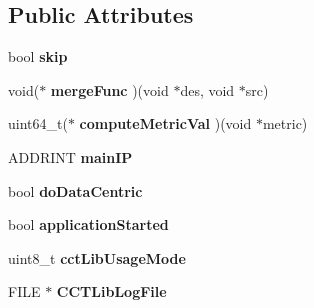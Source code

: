 \subsection*{Public Attributes}
\begin{DoxyCompactItemize}
\item 
\hypertarget{structPinCCTLib_1_1CCT__LIB__GLOBAL__STATE_a19abbe5291babc30a08934cb05a00dfe}{bool {\bfseries skip}}\label{structPinCCTLib_1_1CCT__LIB__GLOBAL__STATE_a19abbe5291babc30a08934cb05a00dfe}

\item 
\hypertarget{structPinCCTLib_1_1CCT__LIB__GLOBAL__STATE_af97986d5ef97aa40973f157ff1aee7c1}{void($\ast$ {\bfseries merge\-Func} )(void $\ast$des, void $\ast$src)}\label{structPinCCTLib_1_1CCT__LIB__GLOBAL__STATE_af97986d5ef97aa40973f157ff1aee7c1}

\item 
\hypertarget{structPinCCTLib_1_1CCT__LIB__GLOBAL__STATE_a75e68912e1f88931d02ea50bed49e29f}{uint64\-\_\-t($\ast$ {\bfseries compute\-Metric\-Val} )(void $\ast$metric)}\label{structPinCCTLib_1_1CCT__LIB__GLOBAL__STATE_a75e68912e1f88931d02ea50bed49e29f}

\item 
\hypertarget{structPinCCTLib_1_1CCT__LIB__GLOBAL__STATE_a2fea60b222f777ad521446538f5f862c}{A\-D\-D\-R\-I\-N\-T {\bfseries main\-I\-P}}\label{structPinCCTLib_1_1CCT__LIB__GLOBAL__STATE_a2fea60b222f777ad521446538f5f862c}

\item 
\hypertarget{structPinCCTLib_1_1CCT__LIB__GLOBAL__STATE_ae9ff50a9bffb2dfa4e55ea0b16df48a5}{bool {\bfseries do\-Data\-Centric}}\label{structPinCCTLib_1_1CCT__LIB__GLOBAL__STATE_ae9ff50a9bffb2dfa4e55ea0b16df48a5}

\item 
\hypertarget{structPinCCTLib_1_1CCT__LIB__GLOBAL__STATE_afce7f10b1161d2b2ebbaaf64668bfb93}{bool {\bfseries application\-Started}}\label{structPinCCTLib_1_1CCT__LIB__GLOBAL__STATE_afce7f10b1161d2b2ebbaaf64668bfb93}

\item 
\hypertarget{structPinCCTLib_1_1CCT__LIB__GLOBAL__STATE_aa4ede5bc47af006fd6a5f09d9b0b0f61}{uint8\-\_\-t {\bfseries cct\-Lib\-Usage\-Mode}}\label{structPinCCTLib_1_1CCT__LIB__GLOBAL__STATE_aa4ede5bc47af006fd6a5f09d9b0b0f61}

\item 
\hypertarget{structPinCCTLib_1_1CCT__LIB__GLOBAL__STATE_ae8bed58528c6ffb3aad23882c76fdc69}{F\-I\-L\-E $\ast$ {\bfseries C\-C\-T\-Lib\-Log\-File}}\label{structPinCCTLib_1_1CCT__LIB__GLOBAL__STATE_ae8bed58528c6ffb3aad23882c76fdc69}


\end{DoxyCompactItemize}
